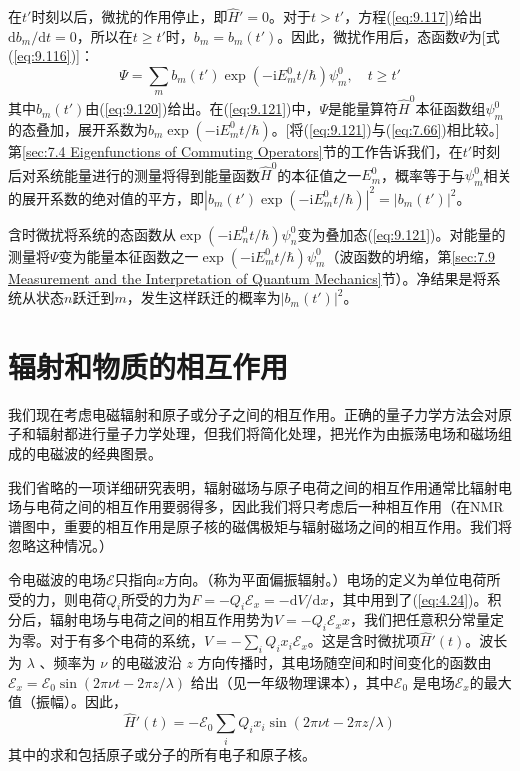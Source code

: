     在$t'$时刻以后，微扰的作用停止，即$\hat{H}'=0$。对于$t > t'$，方程(\ref{eq:9.117})给出$\mathrm{d}b_m /\mathrm{d}t = 0$，所以在$t \geq t'$时，$b_m = b_m\left(t'\right)$。因此，微扰作用后，态函数$\Psi$为[式(\ref{eq:9.116})]：
    \begin{equation}
        \Psi = \sum_mb_m\left(t'\right)\exp\left(-\mathrm{i}E_m^0t/\hbar\right)\psi_m^0, \quad t \geq t'
        \label{eq:9.121}
    \end{equation}
    其中$b_m\left(t'\right)$由(\ref{eq:9.120})给出。在(\ref{eq:9.121})中，$\Psi$是能量算符$\hat{H}^0$本征函数组$\psi_m^0$的态叠加，展开系数为$b_m\exp\left(-\mathrm{i}E_m^0t/\hbar\right)$。[将(\ref{eq:9.121})与(\ref{eq:7.66})相比较。]第\ref{sec:7.4 Eigenfunctions of Commuting Operators}节的工作告诉我们，在$t'$时刻后对系统能量进行的测量将得到能量函数$\hat{H}^0$的本征值之一$E_m^0$，概率等于与$\psi_m^0$相关的展开系数的绝对值的平方，即$\left|b_m\left(t'\right)\exp\left(-\mathrm{i}E_m^0t/\hbar\right)\right|^2 = \left|b_m\left(t'\right)\right|^2$。
    
    含时微扰将系统的态函数从$\exp\left(-\mathrm{i}E_n^0t/\hbar\right)\psi_n^0$变为叠加态(\ref{eq:9.121})。对能量的测量将$\Psi$变为能量本征函数之一$\exp\left(-\mathrm{i}E_m^0t/\hbar\right)\psi_m^0$（波函数的坍缩，第\ref{sec:7.9 Measurement and the Interpretation of Quantum Mechanics}节）。净结果是将系统从状态$n$跃迁到$m$，发生这样跃迁的概率为$\left|b_m\left(t'\right)\right|^2$。

\section{辐射和物质的相互作用}
\label{sec:9.9 Interaction of Radiation and Matter}

    我们现在考虑电磁辐射和原子或分子之间的相互作用。正确的量子力学方法会对原子和辐射都进行量子力学处理，但我们将简化处理，把光作为由振荡电场和磁场组成的电磁波的经典图景。

    我们省略的一项详细研究表明，辐射磁场与原子电荷之间的相互作用通常比辐射电场与电荷之间的相互作用要弱得多，因此我们将只考虑后一种相互作用（在NMR谱图中，重要的相互作用是原子核的磁偶极矩与辐射磁场之间的相互作用。我们将忽略这种情况。）

    令电磁波的电场$\mathscr{E}$只指向$x$方向。（称为平面偏振辐射。）电场的定义为单位电荷所受的力，则电荷$Q_i$所受的力为$F = -Q_i \mathscr{E}_x = -\mathrm{d}V /\mathrm{d}x$，其中用到了(\ref{eq:4.24})。积分后，辐射电场与电荷之间的相互作用势为$V = -Q_i \mathscr{E}_xx$，我们把任意积分常量定为零。对于有多个电荷的系统，$V = -\sum_i Q_i x_i \mathscr{E}_x$。这是含时微扰项$\hat{H}'\left(t\right)$。波长为 $\lambda$ 、频率为 $\nu$ 的电磁波沿 $z$ 方向传播时，其电场随空间和时间变化的函数由 $\mathscr{E}_x = \mathscr{E}_0\sin\left(2\pi\nu t - 2\pi z/\lambda\right)$ 给出（见一年级物理课本），其中$\mathscr{E}_0$ 是电场$\mathscr{E}_x$的最大值（振幅）。因此，
    \begin{equation*}
        \hat{H}'\left(t\right) = -\mathscr{E}_0\sum_i Q_i x_i \sin\left(2\pi\nu t - 2\pi z/\lambda\right)
    \end{equation*}
    其中的求和包括原子或分子的所有电子和原子核。

